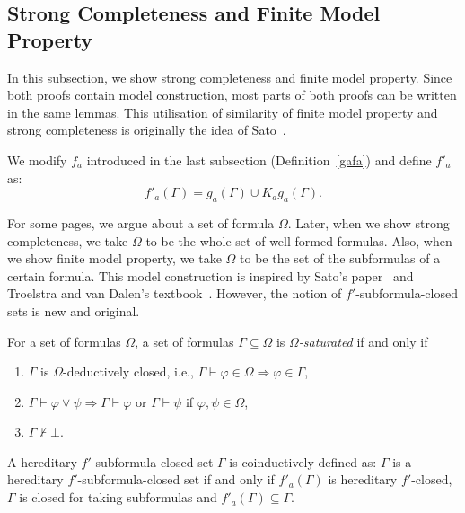 \subsection{Strong Completeness and Finite Model Property}

In this subsection, we show strong completeness and finite model property.
Since both proofs contain model construction,
most parts of both proofs can be written in the same lemmas.
 This utilisation of similarity of finite model property and strong completeness 
is originally the idea of
Sato~\cite{sato13study}.

\begin{definition}
We modify $f_a$ introduced in the last subsection (Definition~\ref{gafa}) and define $f'_a$ as:
 \[
  f'_a(\Gamma) = g_a(\Gamma) \cup K_ag_a(\Gamma).
 \]
\end{definition}

For some pages, we argue about a
set of formula $\Omega$. Later, when we show
strong completeness, we take $\Omega$ to be the whole set of well formed formulas.  Also,
when we show finite model property, we take $\Omega$ to be the set of the subformulas of a
certain formula.  This model construction is inspired by
Sato's paper~\cite{sato13study}
 and Troelstra and van Dalen's textbook~\cite{troelstra1988constructivism}.
 However, the notion of $f'$-subformula-closed sets is new and original.

\begin{definition}
\label{saturated-set}
 For a set of formulas $\Omega$, 
 a set of formulas $\Gamma\subseteq\Omega$ is \textit{$\Omega$-saturated} if and only if
\begin{enumerate}
 \item $\Gamma$ is $\Omega$-deductively closed, i.e., $\Gamma\vdash\varphi\in
       \Omega\Rightarrow
       \varphi\in\Gamma$,
 \item $\Gamma\vdash\varphi\vee\psi \Rightarrow \Gamma\vdash\varphi$ or $\Gamma\vdash\psi$
       if $\varphi,\psi\in\Omega$,
 \item $\Gamma\not\vdash\bot$.
\end{enumerate}
\end{definition}

\begin{definition}
 A hereditary $f'$-subformula-closed set $\Gamma$ is coinductively defined as:
 $\Gamma$ is a hereditary $f'$-subformula-closed set if and only
 if $f'_a(\Gamma)$ is hereditary $f'$-closed, $\Gamma$ is closed for taking subformulas and 
$f'_a(\Gamma)\subseteq \Gamma$.
\end{definition}

